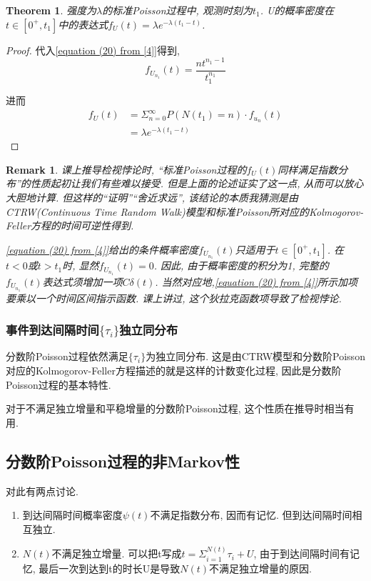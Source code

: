\documentclass[a4paper, 12pt]{ctexart}
\newtheorem{theorem}{Theorem}[section]
\newtheorem*{remark}{Remark}
\begin{document}
\begin{theorem}
强度为$\lambda$的标准Poisson过程中, 观测时刻为$t_1$. U的概率密度在$t\in [0^+,t_1]$中的表达式$f_U(t)=\lambda e^{-\lambda(t_1-t)}$.
\end{theorem}
\begin{proof}
代入\eqref{equation (20) from [4]}得到,
\begin{equation}
f_{U_{n_1}}(t)=\frac{nt^{n_1-1}}{t_1^{n_1}}
\end{equation}

进而
\begin{equation}
\begin{split}
f_U(t)&=\Sigma_{n=0}^{\infty}P(N(t_1)=n)\cdot f_{u_n}(t)\\
&=\lambda e^{-\lambda (t_1-t)}
\end{split}
\end{equation}


\end{proof}
\begin{remark}
课上推导检视悖论时, ``标准Poisson过程的$f_U(t)$同样满足指数分布''的性质起初让我们有些难以接受. 但是上面的论述证实了这一点, 从而可以放心大胆地计算. 但这样的``证明''``舍近求远'', 该结论的本质我猜测是由CTRW(Continuous Time Random Walk)模型和标准Poisson所对应的Kolmogorov-Feller方程的时间可逆性得到.

\eqref{equation (20) from [4]}给出的条件概率密度$f_{U_{n_1}}(t)$只适用于$t \in [0^+,t_1]$. 在$t<0$或$t>t_1$时, 显然$f_{U_{n_1}}(t)=0$. 因此, 由于概率密度的积分为1, 完整的$f_{U_{n_1}}(t)$表达式须增加一项$C\delta (t)$. 当然对应地,\eqref{equation (20) from [4]}所示加项要乘以一个时间区间指示函数. 课上讲过, 这个狄拉克函数项导致了检视悖论.
\end{remark}

\subsubsection{事件到达间隔时间$\{\tau _i\}$独立同分布}
分数阶Poisson过程依然满足$\{\tau _i\}$为独立同分布. 这是由CTRW模型和分数阶Poisson对应的Kolmogorov-Feller方程描述的就是这样的计数变化过程, 因此是分数阶Poisson过程的基本特性. 

对于不满足独立增量和平稳增量的分数阶Poisson过程, 这个性质在推导时相当有用.
\subsection{分数阶Poisson过程的非Markov性}
对此有两点讨论. 

\begin{enumerate}[1)]
\item 到达间隔时间概率密度$\psi (t)$不满足指数分布,   因而有记忆. 但到达间隔时间相互独立. 

\item $N(t)$不满足独立增量. 可以把t写成$t=\Sigma _{i=1}^{N(t)} \tau _i +U$,   由于到达间隔时间有记忆,   最后一次到达到t的时长U是导致$N(t)$不满足独立增量的原因. 

\end{enumerate}
\end{document}
